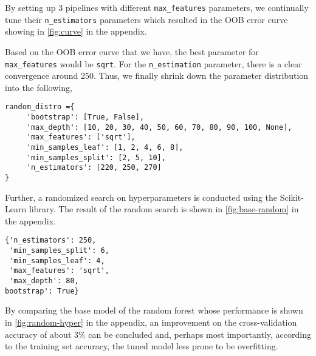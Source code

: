 By setting up 3 pipelines with different \verb|max_features| parameters, we continually tune their \verb|n_estimators| parameters which resulted in
the OOB error curve showing in \autoref{fig:curve} in the appendix.

Based on the OOB error curve that we have, the best parameter for \verb|max_features| would be \verb|sqrt|.
For the \verb|n_estimation| parameter, there is a clear convergence around 250.
Thus, we finally shrink down the parameter distribution into the following,

\begin{verbatim}
random_distro ={
     'bootstrap': [True, False],
     'max_depth': [10, 20, 30, 40, 50, 60, 70, 80, 90, 100, None],
     'max_features': ['sqrt'],
     'min_samples_leaf': [1, 2, 4, 6, 8],
     'min_samples_split': [2, 5, 10],
     'n_estimators': [220, 250, 270]
}
\end{verbatim}


Further, a randomized search on hyperparameters is conducted using the Scikit-Learn library.
The result of the random search is shown in \autoref{fig:base-random} in the appendix.

\begin{verbatim}
{'n_estimators': 250,
 'min_samples_split': 6,
 'min_samples_leaf': 4,
 'max_features': 'sqrt',
 'max_depth': 80,
bootstrap': True}
\end{verbatim}

By comparing the base model of the random forest whose performance is shown in \autoref{fig:random-hyper} in the appendix, an improvement on the cross-validation accuracy of about 3\% can be concluded and, perhaps most importantly, according to the training set accuracy, the tuned model less prone to be overfitting.

